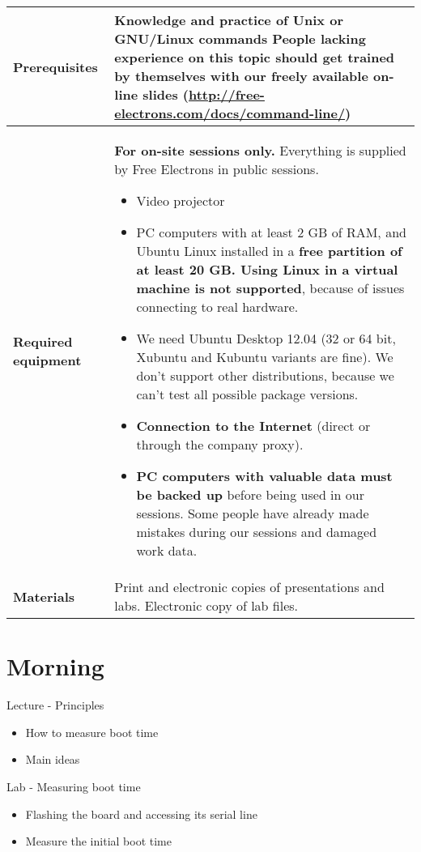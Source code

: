 \documentclass[a4paper,12pt,obeyspaces,spaces,hyphens]{article}
\begin{document}
{\begin{tabularx}{\textwidth}{|g|h|}
    {\bf Prerequisites} & {\bf Knowledge and practice of Unix or
      GNU/Linux commands}
    \newline People lacking experience on this topic should get
    trained by themselves with our freely available on-line slides
    (\url{http://free-electrons.com/docs/command-line/})
     \\
    \hline

    {\bf Required equipment} &
    {\bf For on-site sessions only.}
    \newline Everything is supplied by Free Electrons in public sessions.
    \begin{itemize}
    \item Video projector
    \item PC computers with at least 2 GB of RAM, and Ubuntu Linux
    installed in a {\bf free partition of at least 20 GB. Using Linux
      in a virtual machine is not supported}, because of issues
    connecting to real hardware.
    \item We need Ubuntu Desktop 12.04 (32 or 64 bit, Xubuntu and
    Kubuntu variants are fine). We don't support other
    distributions, because we can't test all possible package versions.
    \item {\bf Connection to the Internet} (direct or through the
    company proxy).
    \item {\bf PC computers with valuable data must be backed up}
    before being used in our sessions.  Some people have already made
    mistakes during our sessions and damaged work data.
    \end{itemize} \\
    \hline

    {\bf Materials} & Print and electronic copies of presentations and
    labs.
    \newline Electronic copy of lab files.\\
    \hline

\end{tabularx}}
\normalsize


\section{Morning}

\feagendatwocolumn
{Lecture - Principles}
{
  \begin{itemize}
  \item How to measure boot time
  \item Main ideas
  \end{itemize}
}
{Lab - Measuring boot time}
{
 \begin{itemize}
 \item Flashing the board and accessing its serial line
 \item Measure the initial boot time 
 \end{itemize}
}
\end{document}
